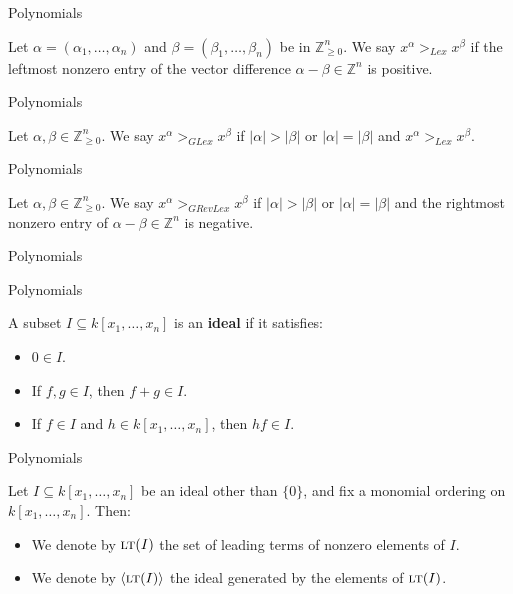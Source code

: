 \documentclass{beamer}
\def\bZ{\mathbb{Z}}
\def\sbs{\subseteq}
\newcommand{\LT}{\ensuremath{\text{\sc lt}}}
\begin{document}
\begin{frame}{Polynomials}
  \begin{definition}
    Let $\alpha = (\alpha_1, \dots, \alpha_n)$ and $\beta = (\beta_1,\dots,\beta_n)$ be in $\bZ_{\ge0}^n$. We say $x^\alpha >_{Lex} x^\beta$ if the leftmost nonzero entry of the vector difference $\alpha - \beta \in \bZ^n$ is positive.
  \end{definition}
\end{frame}

\begin{frame}{Polynomials}
  \begin{definition}
    Let $\alpha,\beta \in \bZ_{\ge0}^n$. We say $x^\alpha >_{GLex} x^\beta$ if $|\alpha| > |\beta|$ or $|\alpha|=|\beta|$ and $x^\alpha >_{Lex} x^\beta$.
  \end{definition}
\end{frame}

\begin{frame}{Polynomials}
  \begin{definition}
    Let $\alpha,\beta \in \bZ_{\ge0}^n$. We say $x^\alpha >_{GRevLex} x^\beta$ if $|\alpha| > |\beta|$ or $|\alpha|=|\beta|$ and the rightmost nonzero entry of $\alpha - \beta \in \bZ^n$ is negative.
  \end{definition}
\end{frame}

\begin{frame}{Polynomials}
\end{frame}

\begin{frame}{Polynomials}
  \begin{definition}
    A subset $I \sbs k[x_1,\dots,x_n]$ is an \textbf{ideal} if it satisfies:
    \begin{itemize}
      \item<2-> $0 \in I$.
      \item<3-> If $f,g \in I$, then $f+g \in I$.
      \item<4-> If $f \in I$ and $h \in k[x_1,\dots,x_n]$, then $hf \in I$.
    \end{itemize}
  \end{definition}
\end{frame}

\begin{frame}{Polynomials}
  \begin{definition}
    Let $I \sbs k[x_1,\dots,x_n]$ be an ideal other than $\{0\}$, and fix a monomial ordering on $k[x_1,\dots,x_n]$. Then:
    \begin{itemize}
      \item<2-> We denote by $\LT(I)$ the set of leading terms of nonzero elements of $I$.
      \item<3-> We denote by $\langle \LT(I) \rangle$ the ideal generated by the elements of $\LT(I)$.
    \end{itemize}
  \end{definition}
\end{frame}
\end{document}
